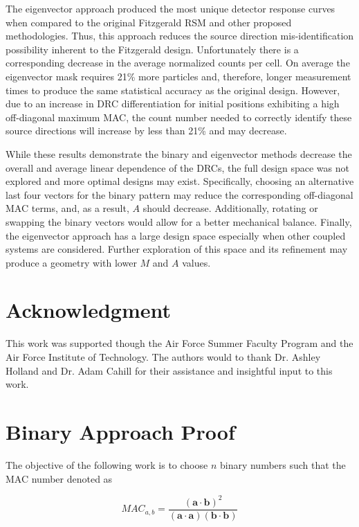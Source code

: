 \documentclass[3p,times]{elsarticle}
\begin{document}
The eigenvector approach produced the most unique detector response curves when compared to the original Fitzgerald RSM and other proposed methodologies. 
Thus, this approach reduces the source direction mis-identification possibility inherent to the Fitzgerald design.
Unfortunately there is a corresponding decrease in the average normalized counts per cell.
On average the eigenvector mask requires 21\% more particles and, therefore, longer measurement times to produce the same statistical accuracy as the original design.
However, due to an increase in DRC differentiation for initial positions exhibiting a high off-diagonal maximum MAC, the count number needed to correctly identify these source directions will increase by less than 21\% and may decrease. 

While these results demonstrate the binary and eigenvector methods decrease the overall and average linear dependence of the DRCs, the full design space was not explored and more optimal designs may exist.  
Specifically, choosing an alternative last four vectors for the binary pattern may reduce the corresponding off-diagonal MAC terms, and, as a result, $A$ should decrease.  
Additionally, rotating or swapping the binary vectors would allow for a better mechanical balance.  
Finally, the eigenvector approach has a large design space especially when other coupled systems are considered.  
Further exploration of this space and its refinement may produce a geometry with lower $M$ and $A$ values.

\section{Acknowledgment}
This work was supported though the Air Force Summer Faculty Program and the Air Force Institute of Technology.  
The authors would to thank Dr. Ashley Holland and Dr. Adam Cahill for their assistance and insightful input to this work.

\appendix

\section{Binary Approach Proof} \label{sec:proof}
The objective of the following work is to choose $n$ binary numbers such that the MAC number denoted as 

\begin{equation}
MAC_{a,b}=\frac{\left(\mathbf{a}\cdot\mathbf{b}\right)^2}{\left(\mathbf{a}\cdot\mathbf{a}\right)\left(\mathbf{b}\cdot\mathbf{b}\right)}
\end{equation}
\end{document}
